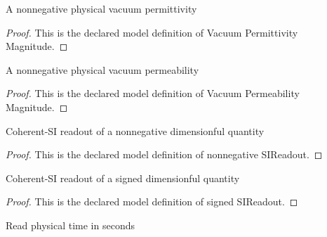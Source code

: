 \begin{definition}
  \label{def:physics:phyx-mini-0983:phyxminiproblems-problemphyxmini0983-vacuumpermittivitymagnitude}
  A nonnegative physical vacuum permittivity
\end{definition}
\begin{proof}
  This is the declared model definition of Vacuum Permittivity Magnitude.
\end{proof}
\begin{definition}
  \label{def:physics:phyx-mini-0983:phyxminiproblems-problemphyxmini0983-vacuumpermeabilitymagnitude}
  A nonnegative physical vacuum permeability
\end{definition}
\begin{proof}
  This is the declared model definition of Vacuum Permeability Magnitude.
\end{proof}
\begin{definition}
  \label{def:physics:phyx-mini-0983:phyxminiproblems-problemphyxmini0983-nonnegativesireadout}
  Coherent-SI readout of a nonnegative dimensionful quantity
\end{definition}
\begin{proof}
  This is the declared model definition of nonnegative SIReadout.
\end{proof}
\begin{definition}
  \label{def:physics:phyx-mini-0983:phyxminiproblems-problemphyxmini0983-signedsireadout}
  Coherent-SI readout of a signed dimensionful quantity
\end{definition}
\begin{proof}
  This is the declared model definition of signed SIReadout.
\end{proof}
\begin{definition}
  \label{def:physics:phyx-mini-0983:phyxminiproblems-problemphyxmini0983-timeinseconds}
  Read physical time in seconds
\end{definition}
